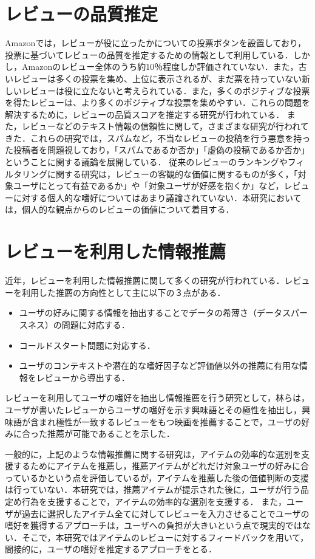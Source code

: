 \documentclass[a4paper,11pt,oneside,openany]{jsbook}
\begin{document}
	\section{レビューの品質推定}
Amazonでは，レビューが役に立ったかについての投票ボタンを設置しており，投票に基づいてレビューの品質を推定するための情報として利用している．しかし，Amazonのレビュー全体のうち約10％程度しか評価されていない\cite{amazon}．また，古いレビューは多くの投票を集め、上位に表示されるが、まだ票を持っていない新しいレビューは役に立たないと考えられている\cite{Moghaddam}．また，多くのポジティブな投票を得たレビューは、より多くのポジティブな投票を集めやすい．これらの問題を解決するために，レビューの品質スコアを推定する研究が行われている\cite{Raghavan}．
また，レビューなどのテキスト情報の信頼性に関して，さまざまな研究が行われてきた\cite{iki,muk,xie,wang}．これらの研究では，スパムなど，不当なレビューの投稿を行う悪意を持った投稿者を問題視しており，「スパムであるか否か」「虚偽の投稿であるか否か」ということに関する議論を展開している．
従来のレビューのランキングやフィルタリングに関する研究は，レビューの客観的な価値に関するものが多く，「対象ユーザにとって有益であるか」や「対象ユーザが好感を抱くか」など，レビューに対する個人的な嗜好についてはあまり議論されていない．本研究においては，個人的な観点からのレビューの価値について着目する．

	\section{レビューを利用した情報推薦}
近年，レビューを利用した情報推薦に関して多くの研究が行われている\cite{rev_reco1,rev_reco2,rev_reco3,rev_reco4,rev_reco5,rev_reco6,rev_reco7,rev_reco8,rev_reco9,rev_reco10,rev_reco11,rev_reco12}．レビューを利用した推薦の方向性として主に以下の３点がある\cite{Li}．
\begin{itemize}
 \item ユーザの好みに関する情報を抽出することでデータの希薄さ（データスパースネス）の問題に対応する．
 \item コールドスタート問題に対応する．
 \item ユーザのコンテキストや潜在的な嗜好因子など評価値以外の推薦に有用な情報をレビューから導出する．
\end{itemize}
\par
レビューを利用してユーザの嗜好を抽出し情報推薦を行う研究として，林ら\cite{hayashi}は，ユーザが書いたレビューからユーザの嗜好を示す興味語とその極性を抽出し，興味語が含まれ極性が一致するレビューをもつ映画を推薦することで，ユーザの好みに合った推薦が可能であることを示した．
\par
一般的に，上記のような情報推薦に関する研究は，アイテムの効率的な選別を支援するためにアイテムを推薦し，推薦アイテムがどれだけ対象ユーザの好みに合っているかという点を評価しているが，アイテムを推薦した後の価値判断の支援は行っていない．本研究では，推薦アイテムが提示された後に，ユーザが行う品定め行為を支援することで，アイテムの効率的な選別を支援する．
また，ユーザが過去に選択したアイテム全てに対してレビューを入力させることでユーザの嗜好を獲得するアプローチは，ユーザへの負担が大きいという点で現実的ではない．そこで，本研究ではアイテムのレビューに対するフィードバックを用いて，間接的に，ユーザの嗜好を推定するアプローチをとる．
\end{document}
